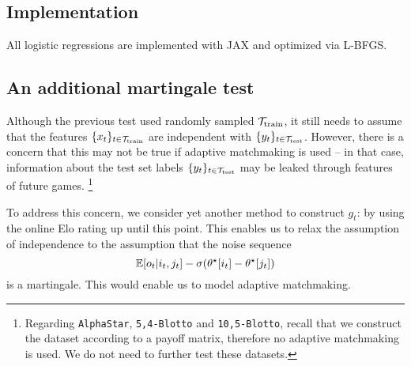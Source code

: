 \iffalse
\paragraph{Regularization}
Recall that the log likelihood ratio statistic is 
\begin{equation*}
\Lambda := 2\left[\min_{\theta\in\R^N}\cL_{\rm test}(\theta) - \min_{\theta\in\R^{N},\alpha\in\R^2}\tilde\cL_{\rm test}([\theta;\alpha])\right].
\end{equation*}
For the ease of optimization, we instead optimize the regularized loss function to obtain a \emph{lower bound} of this statistic. In particular, we compute
\[
\theta_\lambda \gets \argmin_{\theta\in\R^N}\cL_{\rm test}(\theta)+\frac{\lambda}{2}\Vert \theta\Vert^2
\]
and 
\[
\tilde\theta_\lambda, \alpha_\lambda \gets \argmin_{\theta\in\R^{N},\alpha\in\R^2}\tilde\cL_{\rm test}([\theta;\alpha])+\frac{\lambda}{2}\Vert [\theta;\alpha]\Vert^2.
\]
Then
\begin{align*}
\cL_{\rm test}(\theta_\lambda) - \left(\Tilde{\cL}_{\rm test}([\tilde\theta;\alpha])+\frac{\lambda}{2}\Vert [\tilde\theta_\lambda,\alpha_\lambda]\Vert^2\right) \le \cL
\end{align*}

\fi


\subsection{Implementation}
All logistic regressions are implemented with JAX and optimized via L-BFGS.

\subsection{An additional martingale test}
Although the previous test used randomly sampled $\mathcal{T}_{\rm train}$, it still needs to assume that the features $\{x_t\}_{t\in \mathcal{T}_{\rm train}}$ are independent with   $\{y_t\}_{t\in \mathcal{T}_{\rm test}}$. However, there is a concern that this may not be true if adaptive matchmaking is used -- in that case, information about the test set labels $\{y_t\}_{t\in \mathcal{T}_{\rm test}}$ may be leaked through features of future games. \footnote{Regarding \texttt{AlphaStar}, \texttt{5,4-Blotto} and \texttt{10,5-Blotto}, recall that we construct the dataset according to a payoff matrix, therefore no adaptive matchmaking is used. We do not need to further test these datasets.}

To address this concern, we consider yet another method to construct $g_t$: by using the online Elo rating up until this point. This enables us to relax the assumption of independence to the assumption that the noise sequence
\[
\mathbb{E}[o_t|i_t,j_t] - \sigma(\theta^\star[i_t]-\theta^\star[j_t])
\]
is a martingale. This would enable us to model adaptive matchmaking.

